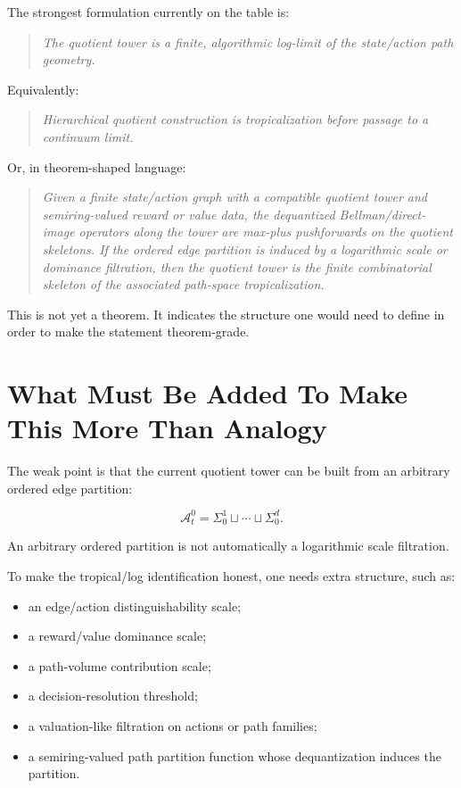 \documentclass[11pt]{article}
\newcommand{\A}{\mathcal A}
\newenvironment{claimbox}
  {\begin{quote}\itshape}
  {\end{quote}}
\begin{document}
The strongest formulation currently on the table is:

\begin{claimbox}
The quotient tower is a finite, algorithmic log-limit of the state/action path
geometry.
\end{claimbox}

Equivalently:

\begin{claimbox}
Hierarchical quotient construction is tropicalization before passage to a
continuum limit.
\end{claimbox}

Or, in theorem-shaped language:

\begin{quote}
\itshape
Given a finite state/action graph with a compatible quotient tower and
semiring-valued reward or value data, the dequantized Bellman/direct-image
operators along the tower are max-plus pushforwards on the quotient skeletons.
If the ordered edge partition is induced by a logarithmic scale or dominance
filtration, then the quotient tower is the finite combinatorial skeleton of the
associated path-space tropicalization.
\end{quote}

This is not yet a theorem. It indicates the structure one would need to define
in order to make the statement theorem-grade.

\section{What Must Be Added To Make This More Than Analogy}

The weak point is that the current quotient tower can be built from an
arbitrary ordered edge partition:

\[
\A_t^0
=
\Sigma_0^1 \sqcup \cdots \sqcup \Sigma_0^d.
\]

An arbitrary ordered partition is not automatically a logarithmic scale
filtration.

To make the tropical/log identification honest, one needs extra structure, such
as:

\begin{itemize}[leftmargin=2em]
\item an edge/action distinguishability scale;
\item a reward/value dominance scale;
\item a path-volume contribution scale;
\item a decision-resolution threshold;
\item a valuation-like filtration on actions or path families;
\item a semiring-valued path partition function whose dequantization induces
the partition.
\end{itemize}
\end{document}

